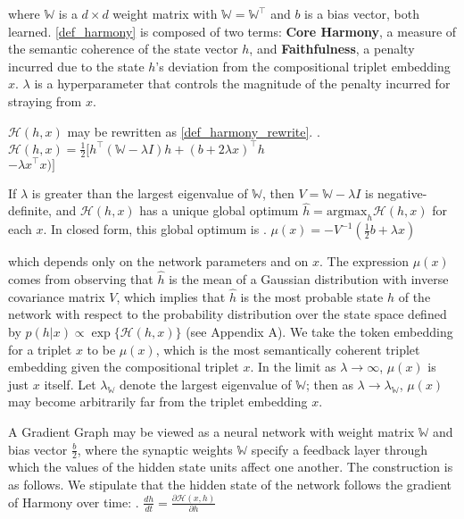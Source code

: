 \documentclass[a4paper,10pt]{article}
\begin{document}
where $\mathbb{W}$ is a $d \times d$ weight matrix with $\mathbb{W}= \mathbb{W}^\top$ and $b$ is a bias vector, both learned. \ref{def_harmony} is composed of two terms: {\color{blue!60} \textbf{Core Harmony}}, a measure of the semantic coherence of the state vector $h$, and {\color{red!70} \textbf{Faithfulness}}, a penalty incurred due to the state $h$'s deviation from the compositional triplet embedding $x$. $\lambda$ is a hyperparameter that controls the magnitude of the penalty incurred for straying from $x$. 

$\mathcal{H}(h,x)$ may be rewritten as \ref{def_harmony_rewrite}. 
\ex. $\mathcal{H}(h,x) = \frac{1}{2} [ h^\top \left(\mathbb{W} - \lambda I \right) h + (b + 2\lambda x)^\top h $\\\phantom{h}\hfill$- \lambda x^\top x)]$ \label{def_harmony_rewrite}

If $\lambda$ is greater than the largest eigenvalue of $\mathbb{W}$, then $V = \mathbb{W}- \lambda I$ is negative-definite, and $\mathcal{H}(h,x)$ has a unique global optimum $\hat{h} = \text{argmax}_h \mathcal{H}(h,x)$ for each $x$. In closed form, this global optimum is
\ex. $\mu(x) =  -V^{-1}\left(\frac{1}{2} b + \lambda x\right) $ \label{def_mu_x}

which depends only on the network parameters and on $x$. The expression $\mu(x)$ comes from observing that $\hat{h}$ is the mean of a Gaussian distribution with inverse covariance matrix $V$, which implies that $\hat{h}$ is the most probable state $h$ of the network with respect to the probability distribution over the state space defined by $p(h|x) \propto \exp\{\mathcal{H}(h,x)\}$ (see Appendix A). We take the token embedding for a triplet $x$ to be $\mu(x)$, which is the most semantically coherent triplet embedding given the compositional triplet $x$. In the limit as $\lambda \rightarrow \infty$, $\mu(x)$ is just $x$ itself. Let $\lambda_{\mathbb{W}}$ denote the largest eigenvalue of $\mathbb{W}$; then as $\lambda \rightarrow \lambda_{\mathbb{W}}$, $\mu(x)$ may become arbitrarily far from the triplet embedding $x$.

A Gradient Graph may be viewed as a neural network with weight matrix $\mathbb{W}$ and bias vector $\frac{b}{2}$, where the synaptic weights $\mathbb{W}$ specify a feedback layer through which the values of the hidden state units affect one another. The construction is as follows. We stipulate that the hidden state of the network follows the gradient of Harmony over time:
\ex. $\frac{d h}{dt} = \frac{\partial \mathcal{H}(x,h)}{ \partial h }$
\end{document}
